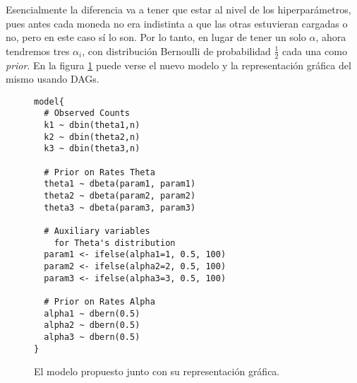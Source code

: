 Esencialmente la diferencia va a tener que estar al nivel de los hiperparámetros, pues antes cada moneda no era indistinta a que las otras estuvieran cargadas o no, pero en este caso sí lo son. Por lo tanto, en lugar de tener un solo $\alpha$, ahora tendremos tres $\alpha_i$, con distribución Bernoulli de probabilidad $\frac{1}{2}$ cada una como \emph{prior}. En la figura \ref{fig:3} puede verse el nuevo modelo y la representación gráfica del mismo usando DAGs.

\begin{figure}[H]
\begin{minipage}{0.55\textwidth}
\begin{lstlisting}[frame=single]
model{  
  # Observed Counts
  k1 ~ dbin(theta1,n)
  k2 ~ dbin(theta2,n)
  k3 ~ dbin(theta3,n)

  # Prior on Rates Theta
  theta1 ~ dbeta(param1, param1)
  theta2 ~ dbeta(param2, param2)
  theta3 ~ dbeta(param3, param3)

  # Auxiliary variables
    for Theta's distribution
  param1 <- ifelse(alpha1=1, 0.5, 100)
  param2 <- ifelse(alpha2=2, 0.5, 100)
  param3 <- ifelse(alpha3=3, 0.5, 100)

  # Prior on Rates Alpha
  alpha1 ~ dbern(0.5)  
  alpha2 ~ dbern(0.5)  
  alpha3 ~ dbern(0.5)  
}
\end{lstlisting}
\end{minipage}%
\begin{minipage}{0.45\textwidth}
\centering
{}
\end{minipage}%
\caption{El modelo propuesto junto con su representación gráfica.}
\label{fig:3}
\end{figure}
